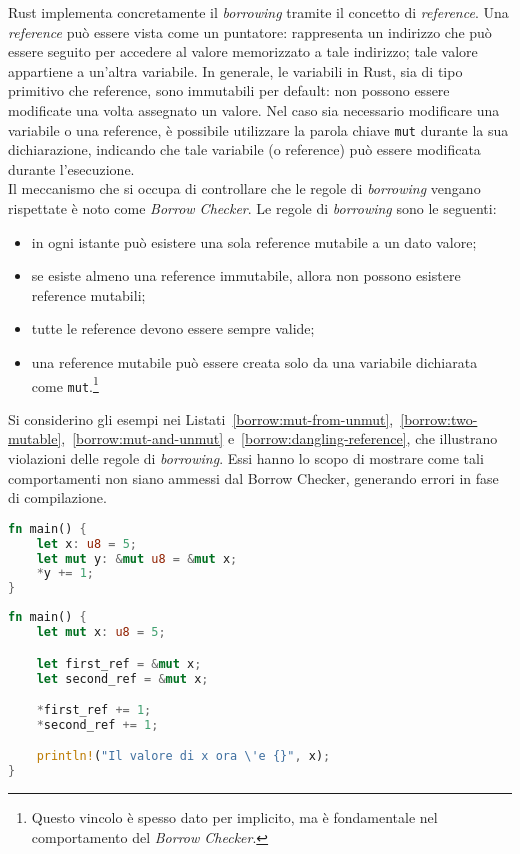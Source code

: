 Rust implementa concretamente il \textit{borrowing} tramite il concetto di \textit{reference}. Una \textit{reference} può essere vista come un puntatore: rappresenta un indirizzo che può essere seguito per accedere al valore memorizzato a tale indirizzo; tale valore appartiene a un'altra variabile.
\break  \break
\noindent In generale, le variabili in Rust, sia di tipo primitivo che reference, sono immutabili per default: non possono essere modificate una volta assegnato un valore. Nel caso sia necessario modificare una variabile o una reference, è possibile  utilizzare la parola chiave \texttt{mut} durante la sua dichiarazione, indicando che tale variabile (o reference) può essere modificata durante l'esecuzione. \hfill
\vspace{10pt}\\
\noindent Il meccanismo che si occupa di controllare che le regole di \textit{borrowing} vengano rispettate è noto come \textit{Borrow Checker}. Le regole di \textit{borrowing} sono le seguenti:
\begin{itemize}
    \item in ogni istante può esistere una sola reference mutabile a un dato valore;
    \item se esiste almeno una reference immutabile, allora non possono esistere reference mutabili;
    \item tutte le reference devono essere sempre valide;
    \item una reference mutabile può essere creata solo da una variabile dichiarata come \texttt{mut}.\footnote{Questo vincolo è spesso dato per implicito, ma è fondamentale nel comportamento del \textit{Borrow Checker}.}
\end{itemize}
Si considerino gli esempi nei Listati~\ref{borrow:mut-from-unmut},~\ref{borrow:two-mutable},~\ref{borrow:mut-and-unmut} e~\ref{borrow:dangling-reference}, che illustrano violazioni delle regole di \textit{borrowing}. Essi hanno lo scopo di mostrare come tali comportamenti non siano ammessi dal Borrow Checker, generando errori in fase di compilazione.
\begin{lstlisting}[language=Rust, caption={Reference mutabile a variabile immutabile}, label={borrow:mut-from-unmut}]
fn main() {
    let x: u8 = 5;
    let mut y: &mut u8 = &mut x;
    *y += 1;
}
\end{lstlisting}

\begin{lstlisting}[language=Rust, caption={Due reference mutabili alla stessa variabile}, label={borrow:two-mutable}]
fn main() {
    let mut x: u8 = 5;

    let first_ref = &mut x;
    let second_ref = &mut x;

    *first_ref += 1;
    *second_ref += 1;

    println!("Il valore di x ora \'e {}", x);
}
\end{lstlisting}

